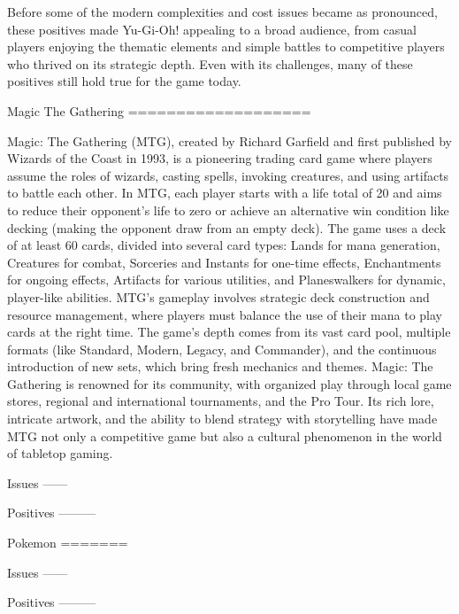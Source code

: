 Before some of the modern complexities and cost issues became as pronounced, these positives made Yu-Gi-Oh! appealing to a broad audience, from casual players enjoying the thematic elements and simple battles to competitive players who thrived on its strategic depth. Even with its challenges, many of these positives still hold true for the game today.




Magic The Gathering
===================

Magic: The Gathering (MTG), created by Richard Garfield and first published by Wizards of the Coast in 1993, is a pioneering trading card game where players assume the roles of wizards, casting spells, invoking creatures, and using artifacts to battle each other. In MTG, each player starts with a life total of 20 and aims to reduce their opponent's life to zero or achieve an alternative win condition like decking (making the opponent draw from an empty deck). The game uses a deck of at least 60 cards, divided into several card types: Lands for mana generation, Creatures for combat, Sorceries and Instants for one-time effects, Enchantments for ongoing effects, Artifacts for various utilities, and Planeswalkers for dynamic, player-like abilities. MTG's gameplay involves strategic deck construction and resource management, where players must balance the use of their mana to play cards at the right time. The game's depth comes from its vast card pool, multiple formats (like Standard, Modern, Legacy, and Commander), and the continuous introduction of new sets, which bring fresh mechanics and themes. Magic: The Gathering is renowned for its community, with organized play through local game stores, regional and international tournaments, and the Pro Tour. Its rich lore, intricate artwork, and the ability to blend strategy with storytelling have made MTG not only a competitive game but also a cultural phenomenon in the world of tabletop gaming.

Issues
------



Positives
---------



Pokemon
=======


Issues
------



Positives
---------
